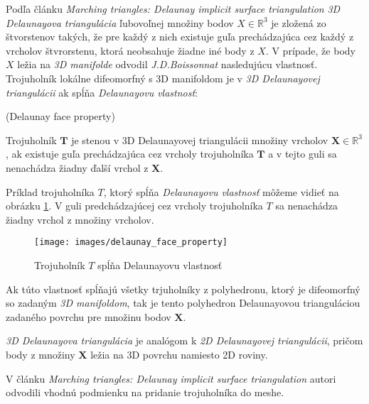 Podľa článku \textit{Marching triangles: Delaunay implicit surface triangulation} \cite{hilton1997marching} 
\textit{3D Delaunayova triangulácia} ľubovoľnej množiny bodov $X\in \mathbb{R}^3$ je 
zložená zo štvorstenov takých, že pre každý z nich existuje guľa prechádzajúca cez každý z vrcholov 
štvrorstenu, ktorá neobsahuje žiadne iné body z $X$. V prípade, že body $X$ ležia na \textit{3D manifolde} 
odvodil \textit{J.D.Boissonnat} \cite{boissonnat1984geometric} nasledujúcu vlastnosť. Trojuholník
lokálne difeomorfný s 3D manifoldom je v \textit{3D Delaunayovej triangulácii} ak spĺňa 
\textit{Delaunayovu vlastnosť}:

\begin{definition}
    (Delaunay face property)

    Trojuholník $\mathbf{T}$ je stenou v 3D Delaunayovej triangulácii množiny vrcholov 
    $\mathbf{X}\in \mathbb{R}^3$, ak existuje guľa prechádzajúca cez vrcholy trojuholníka 
    $\mathbf{T}$ a v tejto guli sa nenachádza žiadny ďalší vrchol z $\mathbf{X}$. 
\end{definition}

Príklad trojuholníka $T$, ktorý spĺňa \textit{Delaunayovu vlastnosť} môžeme vidieť na obrázku 
\ref{obr:delaunay_face_property}. V guli predchádzajúcej cez vrcholy trojuholníka $T$ 
sa nenachádza žiadny vrchol z množiny vrcholov.

\begin{figure}
    \centerline{\texttt{[image: images/delaunay\_face\_property]}}
    \caption[\cite{hilton1996marching} Trojuholník $T$ spĺňa Delaunayovu vlastnosť]{\cite{hilton1996marching} Trojuholník $T$ spĺňa Delaunayovu vlastnosť}
    \label{obr:delaunay_face_property}
\end{figure}

Ak túto vlastnosť spĺňajú všetky trjuholníky z polyhedronu, ktorý je difeomorfný so zadaným 
\textit{3D manifoldom}, tak je tento polyhedron Delaunayovou trianguláciou zadaného povrchu pre 
množinu bodov $\mathbf{X}$.

\textit{3D Delaunayova triangulácia} je analógom k \textit{2D Delaunayovej triangulácii}, pričom
body z množiny $\mathbf{X}$ ležia na 3D povrchu namiesto 2D roviny.

V článku \textit{Marching triangles: Delaunay implicit surface triangulation} \cite{hilton1997marching}
autori odvodili vhodnú podmienku na pridanie trojuholníka do meshe.

